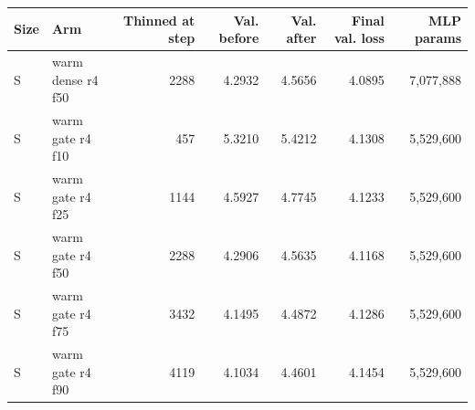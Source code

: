 \begin{tabular}{llrrrrr}
\toprule
Size & Arm & Thinned at step & Val. before & Val. after & Final val. loss & MLP params \\
\midrule
S & warm dense r4 f50 & 2288 & 4.2932 & 4.5656 & 4.0895 & 7,077,888 \\
S & warm gate r4 f10 & 457 & 5.3210 & 5.4212 & 4.1308 & 5,529,600 \\
S & warm gate r4 f25 & 1144 & 4.5927 & 4.7745 & 4.1233 & 5,529,600 \\
S & warm gate r4 f50 & 2288 & 4.2906 & 4.5635 & 4.1168 & 5,529,600 \\
S & warm gate r4 f75 & 3432 & 4.1495 & 4.4872 & 4.1286 & 5,529,600 \\
S & warm gate r4 f90 & 4119 & 4.1034 & 4.4601 & 4.1454 & 5,529,600 \\
\bottomrule
\end{tabular}
